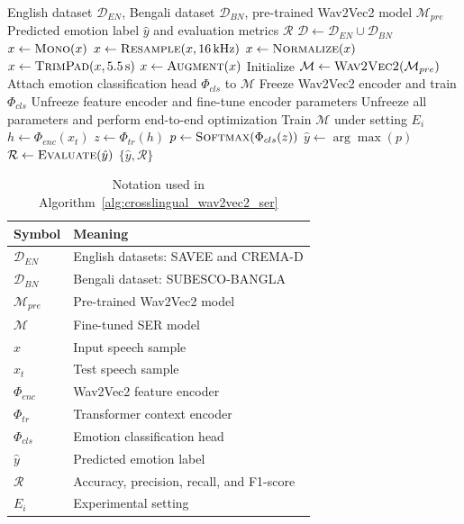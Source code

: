 \documentclass[conference]{IEEEtran}
\begin{document}
\begin{algorithm}[t]
\caption{Proposed Cross-Lingual Wav2Vec2-Based SER}
\label{alg:crosslingual_wav2vec2_ser}
\begin{algorithmic}[1]
\Require English dataset $\mathcal{D}_{EN}$, Bengali dataset $\mathcal{D}_{BN}$, pre-trained Wav2Vec2 model $\mathcal{M}_{pre}$
\Ensure Predicted emotion label $\hat{y}$ and evaluation metrics $\mathcal{R}$
\State $\mathcal{D} \gets \mathcal{D}_{EN} \cup \mathcal{D}_{BN}$
    \State $x \gets \textsc{Mono}(x)$
    \State $x \gets \textsc{Resample}(x,16\,\text{kHz})$
    \State $x \gets \textsc{Normalize}(x)$
    \State $x \gets \textsc{TrimPad}(x,5.5\,\text{s})$
    \State $x \gets \textsc{Augment}(x)$
\EndFor
\State Initialize $\mathcal{M} \gets \textsc{Wav2Vec2}(\mathcal{M}_{pre})$
\State Attach emotion classification head $\Phi_{cls}$ to $\mathcal{M}$
\State Freeze Wav2Vec2 encoder and train $\Phi_{cls}$
\State Unfreeze feature encoder and fine-tune encoder parameters
\State Unfreeze all parameters and perform end-to-end optimization
    \State Train $\mathcal{M}$ under setting $E_i$
        \State $h \gets \Phi_{enc}(x_t)$
        \State $z \gets \Phi_{tr}(h)$
        \State $p \gets \textsc{Softmax}(\Phi_{cls}(z))$
        \State $\hat{y} \gets \arg\max(p)$
    \EndFor
    \State $\mathcal{R} \gets \textsc{Evaluate}(\hat{y})$
\EndFor
\State \Return $\{\hat{y},\mathcal{R}\}$
\end{algorithmic}
\end{algorithm}

\begin{table}[t]
\centering
\caption{Notation used in Algorithm~\ref{alg:crosslingual_wav2vec2_ser}}
\label{tab:algorithm_notation}
\begin{tabular}{ll}
\hline
\textbf{Symbol} & \textbf{Meaning} \\
\hline
$\mathcal{D}_{EN}$ & English datasets: SAVEE and CREMA-D \\
$\mathcal{D}_{BN}$ & Bengali dataset: SUBESCO-BANGLA \\
$\mathcal{M}_{pre}$ & Pre-trained Wav2Vec2 model \\
$\mathcal{M}$ & Fine-tuned SER model \\
$x$ & Input speech sample \\
$x_t$ & Test speech sample \\
$\Phi_{enc}$ & Wav2Vec2 feature encoder \\
$\Phi_{tr}$ & Transformer context encoder \\
$\Phi_{cls}$ & Emotion classification head \\
$\hat{y}$ & Predicted emotion label \\
$\mathcal{R}$ & Accuracy, precision, recall, and F1-score \\
$E_i$ & Experimental setting \\
\hline
\end{tabular}
\end{table}
\end{document}
